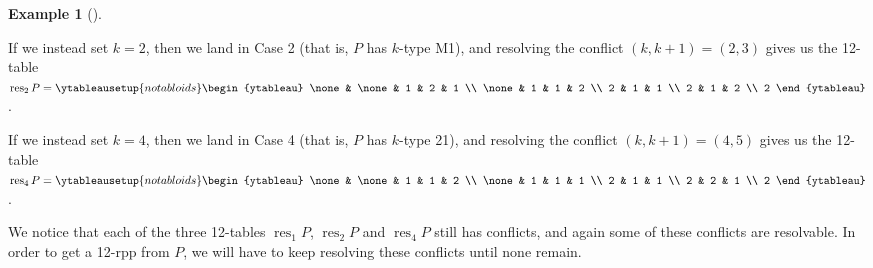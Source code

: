 \documentclass[numbers=enddot,12pt,final,onecolumn,notitlepage]{scrartcl}%
\theoremstyle{definition}
\newtheorem{exmp}[theo]{Example}
\newenvironment{example}[1][]
{\begin{exmp}[#1]\begin{leftbar}}
{\end{leftbar}\end{exmp}}
\newenvironment{verlong}{}{}
\begin{document}
\begin{verlong}
\begin{example}
If we instead set $k=2$, then we land in Case 2 (that is, $P$ has $k$-type
M1), and resolving the conflict $\left(  k,k+1\right)  =\left(  2,3\right)  $
gives us the 12-table $\operatorname*{res}\nolimits_{2}P=%
\ytableausetup{notabloids}
\begin{ytableau}
\none& \none& 1 & 2 & 1 \\
\none& 1 & 1 & 2 \\
2 & 1 & 1 \\
2 & 1 & 2 \\
2
\end{ytableau}%
$.

If we instead set $k=4$, then we land in Case 4 (that is, $P$ has $k$-type
21), and resolving the conflict $\left(  k,k+1\right)  =\left(  4,5\right)  $
gives us the 12-table $\operatorname*{res}\nolimits_{4}P=%
\ytableausetup{notabloids}
\begin{ytableau}
\none& \none& 1 & 1 & 2 \\
\none& 1 & 1 & 1 \\
2 & 1 & 1 \\
2 & 2 & 1 \\
2
\end{ytableau}%
$.

We notice that each of the three 12-tables $\operatorname*{res}\nolimits_{1}%
P$, $\operatorname*{res}\nolimits_{2}P$ and $\operatorname*{res}%
\nolimits_{4}P$ still has conflicts\footnotemark, and again some of these
conflicts are resolvable. In order to get a 12-rpp from $P$, we will have to
keep resolving these conflicts until none remain.
\end{example}


\end{verlong}
\end{document}
